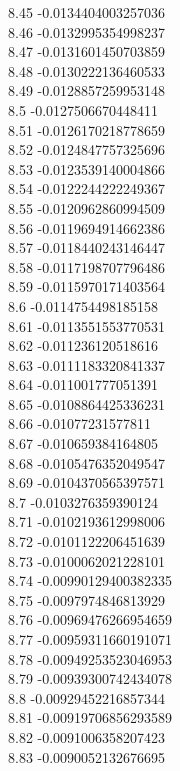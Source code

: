 {8.45	-0.0134404003257036\\
8.46	-0.0132995354998237\\
8.47	-0.0131601450703859\\
8.48	-0.0130222136460533\\
8.49	-0.0128857259953148\\
8.5	-0.0127506670448411\\
8.51	-0.0126170218778659\\
8.52	-0.0124847757325696\\
8.53	-0.0123539140004866\\
8.54	-0.0122244222249367\\
8.55	-0.0120962860994509\\
8.56	-0.0119694914662386\\
8.57	-0.0118440243146447\\
8.58	-0.0117198707796486\\
8.59	-0.0115970171403564\\
8.6	-0.0114754498185158\\
8.61	-0.0113551553770531\\
8.62	-0.011236120518616\\
8.63	-0.0111183320841337\\
8.64	-0.011001777051391\\
8.65	-0.0108864425336231\\
8.66	-0.01077231577811\\
8.67	-0.010659384164805\\
8.68	-0.0105476352049547\\
8.69	-0.0104370565397571\\
8.7	-0.0103276359390124\\
8.71	-0.0102193612998006\\
8.72	-0.0101122206451639\\
8.73	-0.0100062021228101\\
8.74	-0.00990129400382335\\
8.75	-0.0097974846813929\\
8.76	-0.00969476266954659\\
8.77	-0.00959311660191071\\
8.78	-0.00949253523046953\\
8.79	-0.00939300742434078\\
8.8	-0.00929452216857344\\
8.81	-0.00919706856293589\\
8.82	-0.0091006358207423\\
8.83	-0.0090052132676695\\
}
